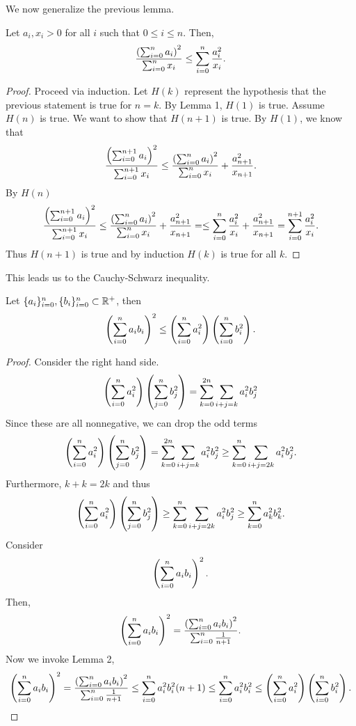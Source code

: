 \documentclass[notitlepage]{simple}
\begin{document}
	We now generalize the previous lemma.
	\begin{lemma}
		Let $a_i,x_i>0$ for all $i$ such that $0\leq i\leq n$.
		Then,
		\[
			\frac{\left( \sum_{i=0}^na_i \right)^2}{\sum_{i=0}^n x_i}\leq \sum_{i=0}^n\frac{a_i^2}{x_i}.
		\]
	\end{lemma}
	\begin{proof}
		Proceed via induction.
		Let $H(k)$ represent the hypothesis that the previous statement is true for $n=k$.
		By Lemma 1, $H(1)$ is true.
		Assume $H(n)$ is true.
		We want to show that $H(n+1)$ is true.
		By $H(1)$, we know that
		\[
			\frac{\left( \sum_{i=0}^{n+1}a_i \right)^2}{\sum_{i=0}^{n+1} x_i}
			\leq \frac{\left( \sum_{i=0}^na_i \right)^2}{\sum_{i=0}^n x_i}+\frac{a_{n+1}^2}{x_{n+1}}.
		\]
		By $H(n)$
		\[
			\frac{\left( \sum_{i=0}^{n+1}a_i \right)^2}{\sum_{i=0}^{n+1} x_i}
			\leq \frac{\left( \sum_{i=0}^na_i \right)^2}{\sum_{i=0}^n x_i}+\frac{a_{n+1}^2}{x_{n+1}}=
			\leq \sum_{i=0}^n\frac{a_i^2}{x_i}+\frac{a_{n+1}^2}{x_{n+1}}
			=\sum_{i=0}^{n+1}\frac{a_i^2}{x_i}.
		\]
		Thus $H(n+1)$ is true and by induction $H(k)$ is true for all $k$.
	\end{proof}
	This leads us to the Cauchy-Schwarz inequality.
	\begin{thm}
		Let $\lbrace a_i \rbrace_{i=0}^n,\lbrace b_i \rbrace_{i=0}^n\subset\mathbb{R}^+$, then
		\[
			\left( \sum_{i=0}^n a_ib_i \right)^2 \leq \left( \sum_{i=0}^n a_i^2 \right)\left( \sum_{i=0}^n b_i^2 \right).
		\]
	\end{thm}
	\begin{proof}
		Consider the right hand side.
		\[
			\left( \sum_{i=0}^n a_i^2 \right)\left( \sum_{j=0}^n b_j^2 \right)=\sum_{k=0}^{2n}\sum_{i+j=k}a_i^2b_j^2
		\]
		Since these are all nonnegative, we can drop the odd terms
		\[
			\left( \sum_{i=0}^n a_i^2 \right)\left( \sum_{j=0}^n b_j^2 \right)
			=\sum_{k=0}^{2n}\sum_{i+j=k}a_i^2b_j^2
			\geq \sum_{k=0}^{n}\sum_{i+j=2k}a_i^2b_j^2.
		\]
		Furthermore, $k+k=2k$ and thus
		\[
			\left( \sum_{i=0}^n a_i^2 \right)\left( \sum_{j=0}^n b_j^2 \right)
			\geq \sum_{k=0}^{n}\sum_{i+j=2k}a_i^2b_j^2
			\geq \sum_{k=0}^{n}a_k^2b_k^2.
		\]
		Consider
		\[
			\left( \sum_{i=0}^n a_ib_i \right)^2.
		\]
		Then,
		\[
			\left( \sum_{i=0}^n a_ib_i \right)^2
			= \frac{\left( \sum_{i=0}^n a_ib_i \right)^2}{\sum_{i=0}^n\frac{1}{n+1}}.
		\]
		Now we invoke Lemma 2,
		\[
			\left( \sum_{i=0}^n a_ib_i \right)^2
			= \frac{\left( \sum_{i=0}^n a_ib_i \right)^2}{\sum_{i=0}^n\frac{1}{n+1}}
			\leq \sum_{i=0}^n a_i^2b_i^2(n+1)
			\leq \sum_{i=0}^n a_i^2b_i^2
			\leq\left( \sum_{i=0}^n a_i^2 \right)\left( \sum_{i=0}^n b_i^2 \right).
		\]
	\end{proof}
\end{document}
